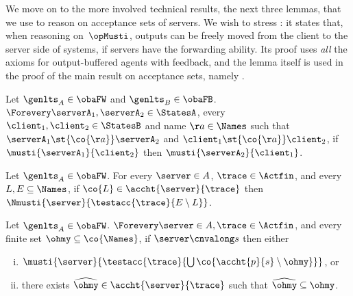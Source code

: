 We move on to the more involved technical results, \ie the next
three lemmas, that we use to reason on acceptance sets of servers.
We wish to stress :
it states that, when reasoning on~$\opMusti$,
outputs can be freely moved from the client to the server side of
systems, if servers %
have the forwarding ability.
Its proof uses {\em all} the axioms for output-buffered agents with
feedback, and the lemma itself is used in the proof of the main
result on acceptance sets, namely .

\begin{lemma}
  \label{lem:must-output-swap-l-fw}
  Let $\genlts_A \in \obaFW$ and
  $\genlts_B \in \obaFB$.
  $\Forevery \serverA_1, \serverA_2 \in \StatesA$,
  every $\client_1, \client_2 \in \StatesB$ and name $\aa \in \Names$ such that
  $\serverA_1 \st{\co{\aa}} \serverA_2$ and
  $\client_1 \st{\co{\aa}} \client_2$,
  if $\musti{\serverA_1}{\client_2}$ then $\musti{\serverA_2}{\client_1}$.
\end{lemma}

\begin{lemma}
  \label{lem:completeness-part-2.2-diff-outputs}
  Let $\genlts_A \in \obaFW$.
  For every $\server \in \States$, $\trace \in \Actfin$,
  and every $L, E \subseteq \Names$, if
  $\co{L} \in \accht{ \server }{ \trace }$
  then $\Nmusti{ \server }{ \testacc{\trace}{E \setminus L}}$.
\end{lemma}



\begin{lemma}
  \label{lem:completeness-part-2.2-auxiliary}
  Let $\genlts_A \in \obaFW$.
  $\Forevery \server \in \States, \trace \in \Actfin$,
  and every finite set $\ohmy \subseteq \co{\Names}$,
  if $\server \cnvalong s$ then either
  \begin{enumerate}[(i)]
      \item
    $\musti{\server}{\testacc{ \trace }{ \bigcup \co{ \accht{p}{s}
          \setminus \ohmy }}}$, or
  \item
    there exists $\widehat{\ohmy} \in \accht{ \server }{ \trace }$ such that $\widehat{\ohmy} \subseteq \ohmy$.
  \end{enumerate}
\end{lemma}

